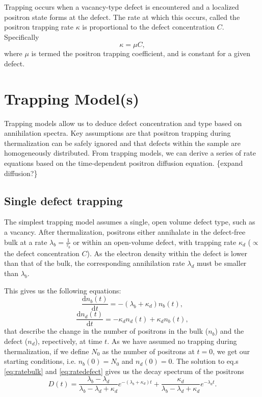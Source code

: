 Trapping occurs when a vacancy-type defect is encountered and a localized positron state forms at the defect. The rate at which this occurs, called the positron trapping rate $\kappa$ is proportional to the defect concentration $C$. Specifically
\begin{equation}
    \kappa = \mu C,
    \label{eq:traprate}
\end{equation}
where $\mu$ is termed the positron trapping coefficient, and is constant for a given defect. 

\section{Trapping Model(s)}

Trapping models allow us to deduce defect concentration and type based on annihilation spectra. Key assumptions are that positron trapping during thermalization can be safely ignored and that defects within the sample are homogeneously distributed. From trapping models, we can derive a series of rate equations based on the time-dependent positron diffusion equation. \{expand diffusion?\}

\subsection{Single defect trapping}

The simplest trapping model assumes a single, open volume defect type, such as a vacancy. After thermalization, positrons either annihalate in the defect-free bulk at a rate $\lambda_b = \frac{1}{\tau_b}$ or within an open-volume defect, with trapping rate $\kappa_d$ ($\propto$ the defect concentration $C$). As the electron density within the defect is lower than that of the bulk, the corresponding annihilation rate $\lambda_d$ must be smaller than $\lambda_b$.

This gives us the following equations:
\begin{equation}
    \frac{\mathrm{d}n_b(t)}{\mathrm{d}t} = -(\lambda_b + \kappa_d) n_b(t),
    \label{eq:ratebulk}
\end{equation}
\begin{equation}
    \frac{\mathrm{d}n_d(t)}{\mathrm{d}t} = - \kappa_d n_d(t) + \kappa_d n_b(t),
    \label{eq:ratedefect}
\end{equation}
that describe the change in the number of positrons in the bulk ($n_b$) and the defect ($n_d$), repectively, at time $t$. As we have assumed no trapping during thermalization, if we define $N_0$ as the number of positrons at $t=0$, we get our starting conditions, i.e. $n_b(0) = N_0$ and $n_d(0) = 0$. The solution to eq.s \ref{eq:ratebulk} and \ref{eq:ratedefect} gives us the decay spectrum of the positrons
\begin{equation}
    D(t) = \frac{\lambda_b - \lambda_d}{\lambda_b - \lambda_d + \kappa_d} e^{- (\lambda_b+\kappa_d) t} + 
    \frac{\kappa_d}{\lambda_b - \lambda_d + \kappa_d} e^{-\lambda_d t}.
\end{equation}

